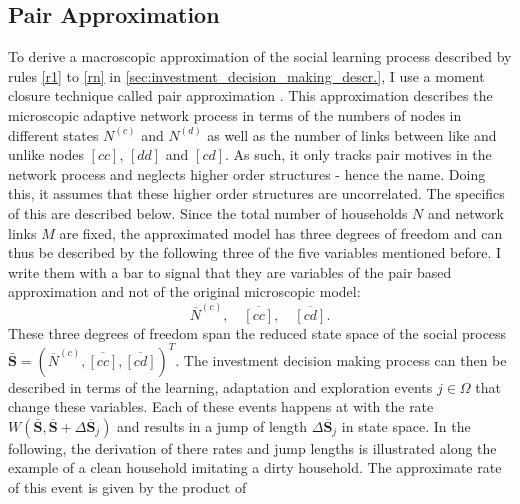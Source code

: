 \subsection{Pair Approximation}
\label{sec:pair_approximation}
To derive a macroscopic approximation of the social learning process described by rules \ref{r1} to \ref{rn} in \cref{sec:investment_decision_making_descr.}, I use a moment closure technique called pair approximation \citep{Keeling1997, Pugliese2009, Gleeson2013}. This approximation describes the microscopic adaptive network process in terms of the numbers of nodes in different states $N^{(c)}$ and $N^{(d)}$ as well as the number of links between like and unlike nodes $[cc]$, $[dd]$ and $[cd]$. As such, it only tracks pair motives in the network process and neglects higher order structures - hence the name. Doing this, it assumes that these higher order structures are uncorrelated. The specifics of this are described below.
Since the total number of households $N$ and network links $M$ are fixed, the approximated model has three degrees of freedom and can thus be described by the following three of the five variables mentioned before. I write them with a bar to signal that they are variables of the pair based approximation and not of the original microscopic model:
\begin{equation}
  \overbar{N}^{(c)}, \quad \overbar{[cc]}, \quad \overbar{[cd]}.
	\label{eq:opinion_formation_macro_variables}
\end{equation}
These three degrees of freedom span the reduced state space of the social process $\mathbf{\bar{S}} = (\overbar{N}^{(c)}, \overbar{[cc]}, \overbar{[cd]})^T$. The investment decision making process can then be described in terms of the learning, adaptation and exploration events $j \in \Omega$ that change these variables. Each of these events happens at with the rate $W(\mathbf{\overbar{S}},\mathbf{\overbar{S}} + \Delta \mathbf{\overbar{S}}_j)$ and results in a jump of length $\Delta \mathbf{\overbar{S}}_j$ in state space.
In the following, the derivation of there rates and jump lengths is illustrated along the example of a clean household imitating a dirty household.
The approximate rate of this event is given by the product of

